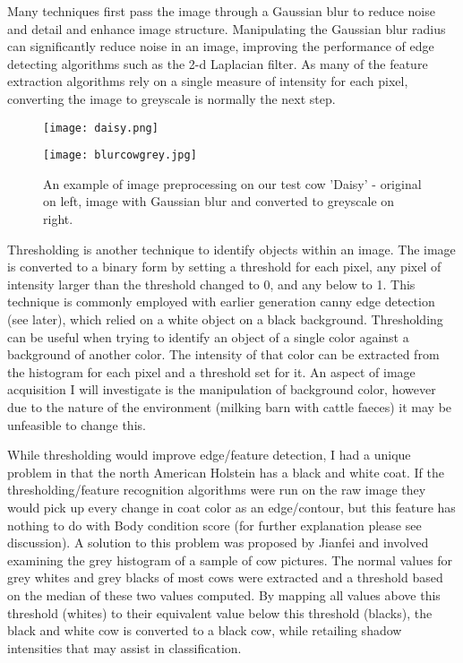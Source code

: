 \documentclass[11pt]{article}
\begin{document}
	Many techniques first pass the image through a Gaussian blur to reduce noise and detail and enhance image structure. 
	Manipulating the Gaussian blur radius can significantly reduce noise in an image, improving the performance of edge detecting algorithms such as the 2-d Laplacian filter.
	As many of the feature extraction algorithms rely on a single measure of intensity for each pixel, converting the image to greyscale is normally the next step.

	\begin{figure}[h!]
		\centering
		\parbox{5cm}{\texttt{[image: daisy.png]}}
		\parbox{5cm}{\texttt{[image: blurcowgrey.jpg]}}
		\caption{An example of image preprocessing on our test cow 'Daisy' - original on left, image with Gaussian blur and converted to greyscale on right.}
	\end{figure}


	Thresholding is another technique to identify objects within an image.
	The image is converted to a binary form by setting a threshold for each pixel, any pixel of intensity larger than the threshold changed to 0, and any below to 1. 
	This technique is commonly employed with earlier generation canny edge detection (see later), which relied on a white object on a black background.
	Thresholding can be useful when trying to identify an object of a single color against a background of another color. 
	The intensity of that color can be extracted from the histogram for each pixel and a threshold set for it.
	An aspect of image acquisition I will investigate is the manipulation of background color, however due to the nature of the environment (milking barn with cattle faeces) it may be unfeasible to change this.


	While thresholding would improve edge/feature detection, I had a unique problem in that the north American Holstein has a black and white coat.
	If the thresholding/feature recognition algorithms were run on the raw image they would pick up every change in coat color as an edge/contour, but this feature has nothing to do with Body condition score (for further explanation please see discussion).
 	A solution to this problem was proposed by Jianfei \cite{Jianfei2011} and involved examining the grey histogram of a sample of cow pictures.
	The normal values for grey whites and grey blacks of most cows were extracted and a threshold based on the median of these two values computed.
	By mapping all values above this threshold (whites) to their equivalent value below this threshold (blacks), the black and white cow is converted to a black cow, while retailing shadow intensities that may assist in classification.
\newpage
\end{document}

